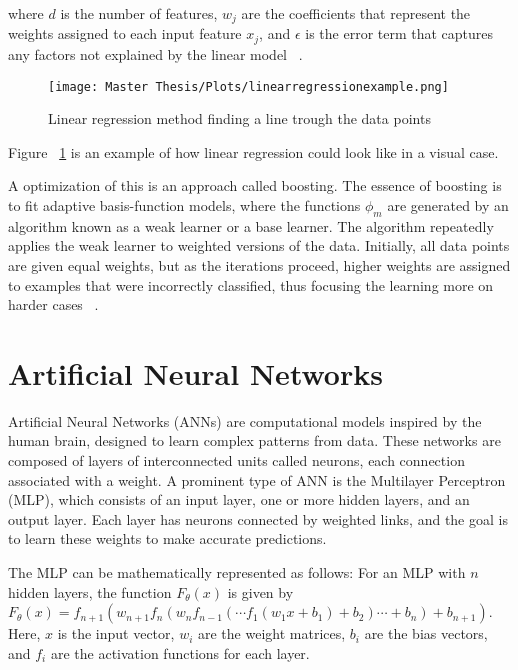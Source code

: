 where $d$ is the number of features, $w_j$ are the coefficients that represent the weights assigned to each input feature $x_j$, and $\epsilon$ is the error term that captures any factors not explained by the linear model ~\cite{murphy2013machine}.

\FloatBarrier
\begin{figure}[h!]
    \centering
    \texttt{[image: Master Thesis/Plots/linearregressionexample.png]}
    \caption{Linear regression method finding a line trough the data points}
    \label{fig:linreg}
\end{figure}
\FloatBarrier

Figure ~\ref{fig:linreg} is an example of how linear regression could look like in a visual case.

A optimization of this is an approach called boosting. The essence of boosting is to fit adaptive basis-function models, where the functions $\phi_m$ are generated by an algorithm known as a weak learner or a base learner. The algorithm repeatedly applies the weak learner to weighted versions of the data. Initially, all data points are given equal weights, but as the iterations proceed, higher weights are assigned to examples that were incorrectly classified, thus focusing the learning more on harder cases ~\cite{murphy2013machine}.

\section{Artificial Neural Networks}

Artificial Neural Networks (ANNs) are computational models inspired by the human brain, designed to learn complex patterns from data. These networks are composed of layers of interconnected units called neurons, each connection associated with a weight. A prominent type of ANN is the Multilayer Perceptron (MLP), which consists of an input layer, one or more hidden layers, and an output layer. Each layer has neurons connected by weighted links, and the goal is to learn these weights to make accurate predictions.

The MLP can be mathematically represented as follows: For an MLP with \( n \) hidden layers, the function \( F_\theta(x) \) is given by \( F_\theta(x) = f_{n+1}(w_{n+1} f_n(w_n f_{n-1}(\cdots f_1(w_1 x + b_1) + b_2) \cdots + b_{n}) + b_{n+1}) \). Here, \( x \) is the input vector, \( w_i \) are the weight matrices, \( b_i \) are the bias vectors, and \( f_i \) are the activation functions for each layer.

